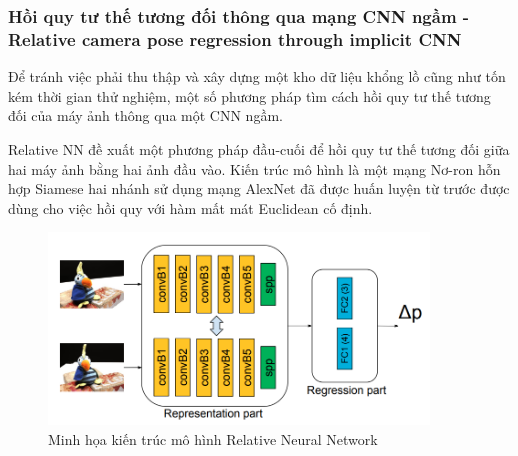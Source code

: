\subsubsection*{Hồi quy tư thế tương đối thông qua mạng CNN ngầm - Relative camera pose regression through implicit CNN}
Để tránh việc phải thu thập và xây dựng một kho dữ liệu khổng lồ cũng như tốn kém thời gian thử nghiệm, một số phương pháp tìm cách hồi quy tư thế tương đối của máy ảnh thông qua một CNN ngầm.

Relative NN \cite{melekhov2017relative} đề xuất một phương pháp đầu-cuối để hồi quy tư thế tương đối giữa hai máy ảnh bằng hai ảnh đầu vào. Kiến trúc mô hình là một mạng Nơ-ron hỗn hợp Siamese hai nhánh sử dụng mạng AlexNet đã được huấn luyện từ trước được dùng cho việc hồi quy với hàm mất mát Euclidean cố định.
\begin{figure}[H]
    \centering
    \includegraphics[width=0.9\textwidth]{pics/Chapter2/relativenn.png}
    \caption{Minh họa kiến trúc mô hình Relative Neural Network \cite{melekhov2017relative}}
\end{figure}


